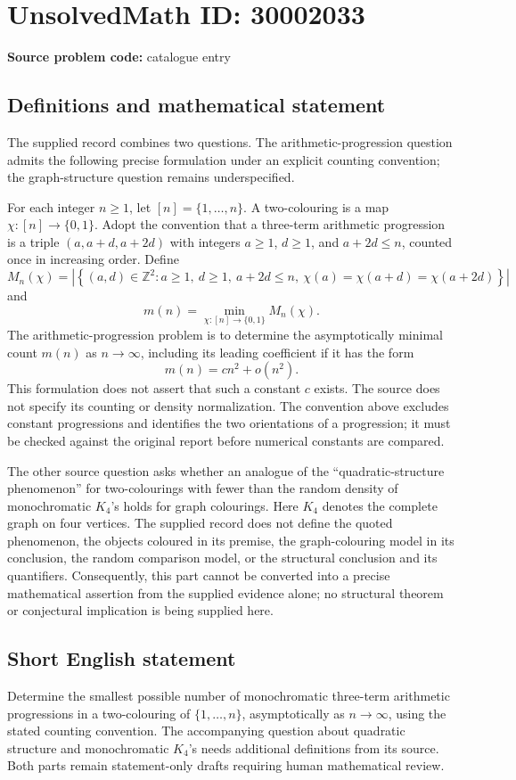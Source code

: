 \documentclass[11pt]{article}
\newcommand{\Z}{\mathbb{Z}}
\begin{document}
\section*{UnsolvedMath ID: 30002033}
\textbf{Source problem code:} catalogue entry
\subsection{Definitions and mathematical statement}
The supplied record combines two questions. The arithmetic-progression question admits the following precise formulation under an explicit counting convention; the graph-structure question remains underspecified.

For each integer \(n\geq 1\), let \([n]=\{1,\ldots,n\}\). A two-colouring is a map \(\chi:[n]\to\{0,1\}\). Adopt the convention that a three-term arithmetic progression is a triple \((a,a+d,a+2d)\) with integers \(a\geq 1\), \(d\geq 1\), and \(a+2d\leq n\), counted once in increasing order. Define
\[
M_n(\chi)=\left|\left\{(a,d)\in\Z^2:a\geq1,\ d\geq1,\ a+2d\leq n,\ \chi(a)=\chi(a+d)=\chi(a+2d)\right\}\right|
\]
and
\[
m(n)=\min_{\chi:[n]\to\{0,1\}}M_n(\chi).
\]
The arithmetic-progression problem is to determine the asymptotically minimal count \(m(n)\) as \(n\to\infty\), including its leading coefficient if it has the form
\[
m(n)=c n^2+o(n^2).
\]
This formulation does not assert that such a constant \(c\) exists. The source does not specify its counting or density normalization. The convention above excludes constant progressions and identifies the two orientations of a progression; it must be checked against the original report before numerical constants are compared.

The other source question asks whether an analogue of the ``quadratic-structure phenomenon'' for two-colourings with fewer than the random density of monochromatic \(K_4\)'s holds for graph colourings. Here \(K_4\) denotes the complete graph on four vertices. The supplied record does not define the quoted phenomenon, the objects coloured in its premise, the graph-colouring model in its conclusion, the random comparison model, or the structural conclusion and its quantifiers. Consequently, this part cannot be converted into a precise mathematical assertion from the supplied evidence alone; no structural theorem or conjectural implication is being supplied here.
\subsection{Short English statement}
Determine the smallest possible number of monochromatic three-term arithmetic progressions in a two-colouring of \(\{1,\ldots,n\}\), asymptotically as \(n\to\infty\), using the stated counting convention. The accompanying question about quadratic structure and monochromatic \(K_4\)'s needs additional definitions from its source. Both parts remain statement-only drafts requiring human mathematical review.
\end{document}

